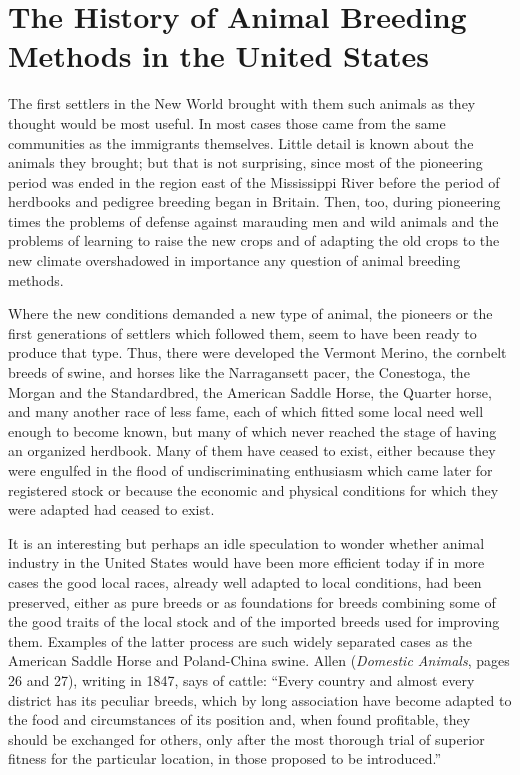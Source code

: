 \chapter[History of Animal Breeding Methods]{The History of Animal Breeding Methods in the United States}
\label{cha:history-animal-breeding-methods-us}

The first settlers in the New World brought with them such animals as they thought would be most useful. In most cases 
those came from the same communities as the immigrants themselves. Little detail is known about the animals they brought; 
but that is not surprising, since most of the pioneering period was ended in the region east of the Mississippi River 
before the period of herdbooks and pedigree breeding began in Britain. Then, too, during pioneering times the problems of 
defense against marauding men and wild animals and the problems of learning to raise the new crops and of adapting the old 
crops to the new climate overshadowed in importance any question of animal breeding methods.

Where the new conditions demanded a new type of animal, the pioneers or the first generations of settlers which followed 
them, seem to have been ready to produce that type. Thus, there were developed the Vermont Merino, the cornbelt breeds of 
swine, and horses like the Narragansett pacer, the Conestoga, the Morgan and the Standardbred, the American Saddle Horse, 
the Quarter horse, and many another race of less fame, each of which fitted some local need well enough to become known, 
but many of which never reached the stage of having an organized herdbook. Many of them have ceased to exist, either 
because they were engulfed in the flood of undiscriminating enthusiasm which came later for registered stock or because the 
economic and physical conditions for which they were adapted had ceased to exist. 

It is an interesting but perhaps an idle speculation to wonder whether animal industry in the United States would have been 
more efficient today if in more cases the good local races, already well adapted to local conditions, had been preserved, 
either as pure breeds or as foundations for breeds combining some of the good traits of the local stock and of the imported 
breeds used for improving them. Examples of the latter process are such widely separated cases as the American Saddle Horse 
and Poland-China swine. Allen (\textit{Domestic Animals}, pages 26 and 27), writing in 1847, says of cattle: ``Every 
country and almost every district has its peculiar breeds, which by long association have become adapted to the food and 
circumstances of its position and, when found profitable, they should be exchanged for others, only after the most thorough
trial of superior fitness for the particular location, in those proposed to be introduced.''

